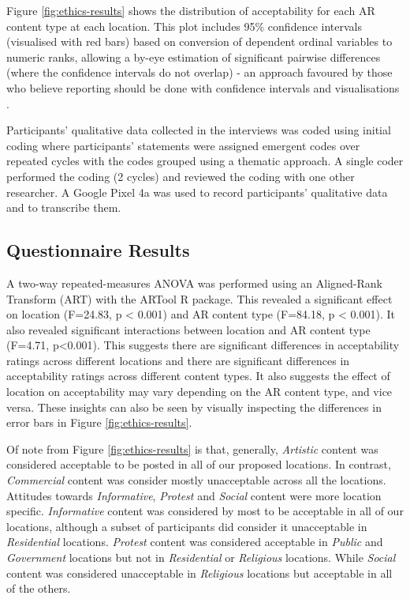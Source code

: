 Figure \ref{fig:ethics-results} shows the distribution of acceptability for each AR content type at each location. 
This plot includes 95\% confidence intervals (visualised with red bars) based on conversion of dependent ordinal variables to numeric ranks, allowing a by-eye estimation of significant pairwise differences (where the confidence intervals do not overlap) - an approach favoured by those who believe reporting should be done with confidence intervals and visualisations \cite{errorbars}.

Participants' qualitative data collected in the interviews was coded using initial coding \cite{openaxebook} where participants’ statements were assigned emergent codes over repeated cycles with the codes grouped using a thematic approach. 
A single coder performed the coding (2 cycles) and reviewed the coding with one other researcher.
A Google Pixel 4a was used to record participants' qualitative data and to transcribe them.



\subsection{Questionnaire Results}
A two-way repeated-measures ANOVA was performed using an Aligned-Rank Transform (ART) with the ARTool R package. 
This revealed a significant effect on location (F=24.83, p < 0.001) and AR content type (F=84.18, p < 0.001). 
It also revealed significant interactions between location and AR content type (F=4.71, p<0.001). 
This suggests there are significant differences in acceptability ratings across different locations and there are significant differences in acceptability ratings across different content types.
It also suggests the effect of location on acceptability may vary depending on the AR content type, and vice versa.
These insights can also be seen by visually inspecting the differences in error bars in Figure \ref{fig:ethics-results}. 

Of note from Figure \ref{fig:ethics-results} is that, generally, \textit{Artistic} content was considered acceptable to be posted in all of our proposed locations. 
In contrast, \textit{Commercial} content was consider mostly unacceptable across all the locations. 
Attitudes towards \textit{Informative}, \textit{Protest} and \textit{Social} content were more location specific. 
\textit{Informative} content was considered by most to be acceptable in all of our locations, although a subset of participants did consider it unacceptable in \textit{Residential} locations. 
\textit{Protest} content was considered acceptable in \textit{Public} and \textit{Government} locations but not in \textit{Residential} or \textit{Religious} locations. 
While \textit{Social} content was considered unacceptable in \textit{Religious} locations but acceptable in all of the others.


